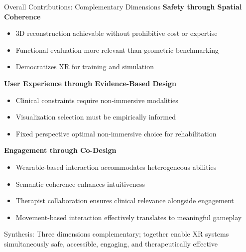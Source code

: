 \begin{frame}{Overall Contributions: Complementary Dimensions}
	\textbf{\textcolor{gbAqua}{Safety through Spatial Coherence}}
	
	\begin{itemize}
		\item 3D reconstruction achievable without prohibitive cost or expertise
		\item Functional evaluation more relevant than geometric benchmarking
		\item Democratizes XR for training and simulation
	\end{itemize}
	
	\vspace{0.3cm}
	
	\textbf{\textcolor{gbAqua}{User Experience through Evidence-Based Design}}
	
	\begin{itemize}
		\item Clinical constraints require non-immersive modalities
		\item Visualization selection must be empirically informed
		\item Fixed perspective optimal non-immersive choice for rehabilitation
	\end{itemize}
	
	\vspace{0.3cm}
	
	\textbf{\textcolor{gbAqua}{Engagement through Co-Design}}
	
	\begin{itemize}
		\item Wearable-based interaction accommodates heterogeneous abilities
		\item Semantic coherence enhances intuitiveness
		\item Therapist collaboration ensures clinical relevance alongside engagement
		\item Movement-based interaction effectively translates to meaningful gameplay
	\end{itemize}
	
	\vspace{0.2cm}
	
	\alert{Synthesis:} Three dimensions complementary; together enable XR systems simultaneously safe, accessible, engaging, and therapeutically effective
\end{frame}

